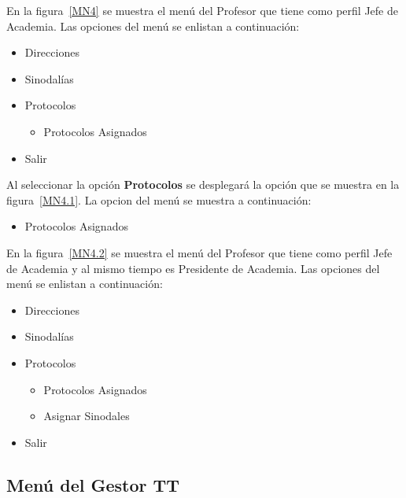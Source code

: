 	En la figura~\ref{MN4} se muestra el menú del Profesor que tiene como perfil Jefe de Academia. Las opciones del menú se enlistan a continuación:
	\begin{itemize}
		\item Direcciones
		\item Sinodalías
		\item Protocolos
		\begin{itemize}
			\item Protocolos Asignados
		\end{itemize}
		\item Salir
	\end{itemize}

	
	
	Al seleccionar la opción \textbf{Protocolos} se desplegará la opción que se muestra en la figura~\ref{MN4.1}. La opcion del menú se muestra a continuación:
	\begin{itemize}
		\item Protocolos Asignados
	\end{itemize}
	
	
	
	En la figura~\ref{MN4.2} se muestra el menú del Profesor que tiene como perfil Jefe de Academia y al mismo tiempo es Presidente de Academia. Las opciones del menú se enlistan a continuación:
	\begin{itemize}
		\item Direcciones
		\item Sinodalías
		\item Protocolos
		\begin{itemize}
			\item Protocolos Asignados
			\item Asignar Sinodales
		\end{itemize}
		\item Salir
	\end{itemize}
	
	
\subsection{Menú del Gestor TT}

